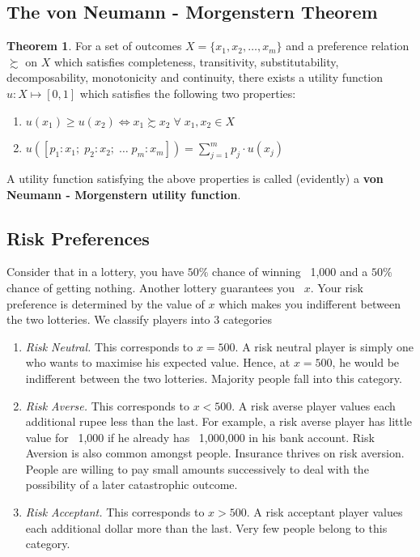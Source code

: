 \documentclass{article}
\theoremstyle{definition}
\newtheorem{theorem}{Theorem}[section]
\begin{document}
\subsection{The von Neumann - Morgenstern Theorem}

\begin{theorem}
For a set of outcomes $X = \{ x_1, x_2, \ldots , x_m \}$ and a preference relation $\succsim$ on $X$ which satisfies completeness, transitivity, substitutability, decomposability, monotonicity and continuity, there exists a utility function $u : X \longmapsto [0,1]$ which satisfies the following two properties:
\begin{enumerate}
    \item $u(x_1) \geq u(x_2) \iff x_1 \succsim x_2 \; \forall \; x_1, x_2 \in X$
    \item $u([p_1 : x_1; \; p_2 : x_2; \; \ldots \; p_m : x_m]) = \sum_{j=1}^{m} p_j \cdot u(x_j)$ 
\end{enumerate}
\end{theorem}

A utility function satisfying the above properties is called (evidently) a \textbf{von Neumann - Morgenstern utility function}.

\subsection{Risk Preferences}

Consider that in a lottery, you have $50 \%$ chance of winning \rupee~1,000 and a $50 \%$ chance of getting nothing. Another lottery guarantees you \rupee~$x$. Your risk preference is determined by the value of $x$ which makes you indifferent between the two lotteries. We classify players into $3$ categories
\begin{enumerate}
    \item \textit{Risk Neutral.} This corresponds to $x = 500$. A risk neutral player is simply one who wants to maximise his expected value. Hence, at $x = 500$, he would be indifferent between the two lotteries. Majority people fall into this category.
    \item \textit{Risk Averse.} This corresponds to $x < 500$. A risk averse player values each additional rupee less than the last. For example, a risk averse player has little value for \rupee~1,000 if he already has \rupee~1,000,000 in his bank account. Risk Aversion is also common amongst people. Insurance thrives on risk aversion. People are willing to pay small amounts successively to deal with the possibility of a later catastrophic outcome. 
    \item \textit{Risk Acceptant.} This corresponds to $x > 500$. A risk acceptant player values each additional dollar more than the last. Very few people belong to this category. 
\end{enumerate}
\end{document}
